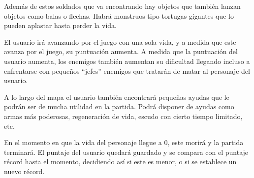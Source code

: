 \documentclass{article}
\begin{document}
\vspace{0.8cm}

Además de estos soldados que va encontrando hay objetos que también lanzan objetos como balas o flechas. Habrá monstruos tipo tortugas gigantes que lo pueden aplastar hasta perder la vida.

\vspace{0.8cm}

El usuario irá avanzando por el juego con una sola vida, y a medida que este avanza por el juego, su puntuación aumenta. A medida que la puntuación del usuario aumenta, los enemigos también aumentan su dificultad llegando incluso a enfrentarse con pequeños “jefes” enemigos que tratarán de matar al personaje del usuario. 

\vspace{0.8cm}

A lo largo del mapa el usuario también encontrará pequeñas ayudas que le podrán ser de mucha utilidad en la partida. Podrá disponer de ayudas como armas más poderosas, regeneración de vida, escudo con cierto tiempo limitado, etc.

\vspace{0.8cm}

En el momento en que la vida del personaje llegue a 0, este morirá y la partida terminará. El puntaje del usuario quedará guardado y se compara con el puntaje récord hasta el momento, decidiendo así si este es menor, o si se establece un nuevo récord.
\end{document}
